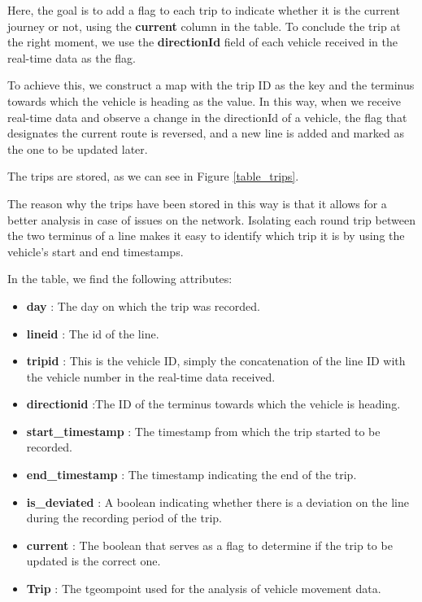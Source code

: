 \documentclass[12pt]{report}
\begin{document}
	Here, the goal is to add a flag to each trip to indicate whether it is the current journey or not, using the \textbf{current} column in the table. To conclude the trip at the right moment, we use the \textbf{directionId} field of each vehicle received in the real-time data as the flag.
	
	To achieve this, we construct a map with the trip ID as the key and the terminus towards which the vehicle is heading as the value. In this way, when we receive real-time data and observe a change in the directionId of a vehicle, the flag that designates the current route is reversed, and a new line is added and marked as the one to be updated later.
	
	
	The trips are stored, as we can see in Figure \ref{table_trips}. 
	
	The reason why the trips have been stored in this way is that it allows for a better analysis in case of issues on the network. Isolating each round trip between the two terminus of a line makes it easy to identify which trip it is by using the vehicle's start and end timestamps.

	
	In the table, we find the following attributes: 
	
	\begin{itemize}[noitemsep]
		\item \textbf{day} : The day on which the trip was recorded.
		\item \textbf{lineid} : The id of the line.
		\item \textbf{tripid} : This is the vehicle ID, simply the concatenation of the line ID with the vehicle number in the real-time data received.
		\item \textbf{directionid} :The ID of the terminus towards which the vehicle is heading.
		\item \textbf{start\_timestamp} : The timestamp from which the trip started to be recorded.
		\item \textbf{end\_timestamp} : The timestamp indicating the end of the trip.
		\item \textbf{is\_deviated} : A boolean indicating whether there is a deviation on the line during the recording period of the trip.
		\item \textbf{current} : The boolean that serves as a flag to determine if the trip to be updated is the correct one.
		\item \textbf{Trip} : The tgeompoint used for the analysis of vehicle movement data.
	\end{itemize}
	
\end{document}
